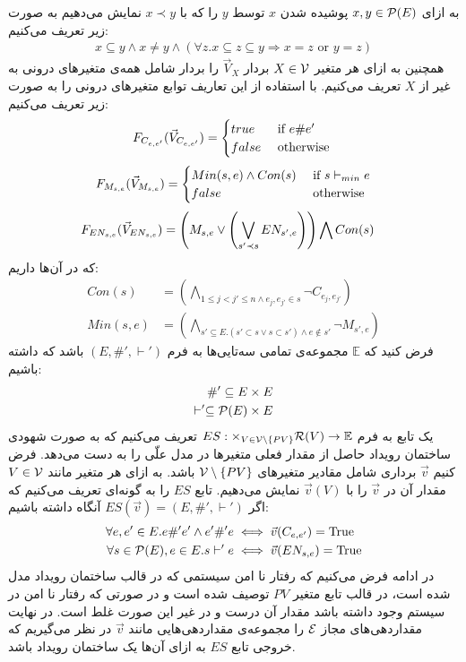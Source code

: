 به ازای
$x,y \in \mathcal{P}(E)$
پوشیده
شدن%
$x$
توسط
$y$
را که با
$x \prec y$
نمایش می‌دهیم به صورت زیر تعریف می‌کنیم:
\begin{align*}
    x \subseteq y \wedge x \neq y \wedge
    (\forall z. x \subseteq z \subseteq y \Rightarrow x = z
    \text{ or } y = z)
\end{align*}
همچنین به ازای هر متغیر
$X \in \mathcal{V}$
بردار
$\vec V_X$
را بردار شامل همه‌ی متغیر‌های درونی به غیر از
$X$
تعریف می‌کنیم.
با استفاده از این تعاریف
توابع متغیر‌های درونی را به صورت زیر تعریف می‌کنیم:
$$
    F_{C_{e,e'}}(\vec V_{C_{e,e'}}) = \begin{cases}
        true  & \text{ if } e \# e' \\
        false & \text{ otherwise }
    \end{cases}
$$
$$
    F_{M_{s,e}}(\vec V_{M_{s,e}}) = \begin{cases}
        Min(s,e) \wedge Con(s) & \text{ if } s \vdash_{min} e \\
        false                  & \text{ otherwise }
    \end{cases}
$$
\begin{align*}
    F_{EN_{s,e}}(\vec V_{EN_{s,e}}) & =
    \left(
    M_{s,e} \vee
    \left(
    \bigvee_{s'\prec s}EN_{s',e}
    \right)
    \right)
    \bigwedge
    Con(s)
\end{align*}
که در آن‌ها داریم:
\begin{align*}
    Con(s)   & =   \left(
    \bigwedge_{ 1\leq j<j' \leq n \wedge e_j,e_{j'} \in s}
    \neg C_{e_j,e_{j'}}
    \right)               \\
    Min(s,e) & = \left(
    \bigwedge_{s' \subseteq E. (s' \subset s \vee s \subset s')
        \wedge e \notin s'}
    \neg M_{s',e}
    \right)
\end{align*}
فرض کنید که
$\mathbb{E}$
مجموعه‌ی تمامی سه‌تایی‌ها به فرم
$(E,\#',\vdash')$
باشد که داشته باشیم:
\begin{align*}
    \#' \subseteq E \times E \\
    \vdash' \subseteq \mathcal{P}(E)\times E
\end{align*}
یک تابع به فرم
$ES: \times_{V \in \mathcal{V}\setminus \{PV\}} \mathcal{R}(V) \rightarrow \mathbb{E}$
تعریف می‌کنیم که به صورت شهودی ساختمان رویداد حاصل از مقدار فعلی متغیر‌ها در مدل علّی را به دست می‌دهد.
فرض کنیم
$\vec v$
برداری شامل مقادیر متغیرهای
$\mathcal{V} \setminus \{PV\}$
باشد.
به ازای هر متغیر مانند
$V \in \mathcal{V}$
مقدار آن در
$\vec v$
را با
$\vec v(V)$
نمایش می‌دهیم.
تابع
$ES$
را به گونه‌ای تعریف می‌کنیم که اگر
$ES(\vec v) = (E,\#',\vdash')$
آنگاه داشته باشیم:
\begin{align*}
    \forall e,e' \in E. e \#' e' \wedge e' \#' e
     & \iff \vec{v}(C_{e,e'}) = \mathrm{True} \\
    \forall s \in \mathcal{P}(E), e \in E.  s \vdash' e
     & \iff \vec{v}(EN_{s,e}) = \mathrm{True}
\end{align*}
در ادامه فرض می‌کنیم که رفتار نا‌ امن%
سیستمی که در قالب ساختمان رویداد مدل شده است، در قالب تابع متغیر
$PV$
توصیف شده است و در صورتی که رفتار نا ‌امن در سیستم وجود داشته باشد مقدار آن درست و در غیر این صورت غلط است.
در نهایت مقداردهی‌های مجاز
$\mathcal{E}$
را مجموعه‌ی مقداردهی‌هایی مانند
$\vec v$
در نظر می‌گیریم که خروجی تابع
$ES$
به ازای آن‌ها یک ساختمان رویداد باشد.

